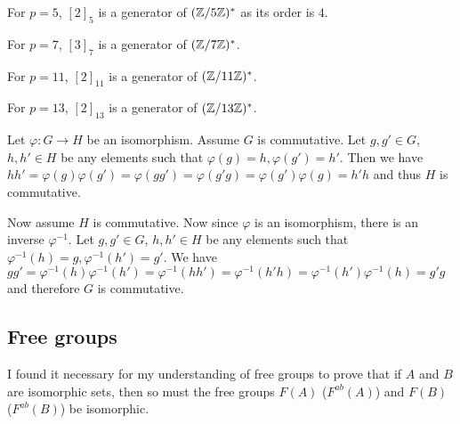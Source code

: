 \begin{problem}
\end{problem}

\begin{solution}
	For $p=5$, $[2]_5$ is a generator of $(\mathbb{Z}/5\mathbb{Z})^*$ as its order is $4$.
	
	For $p=7$, $[3]_7$ is a generator of $(\mathbb{Z}/7\mathbb{Z})^*$.
	
	For $p=11$, $[2]_{11}$ is a generator of $(\mathbb{Z}/11\mathbb{Z})^*$.
	
	For $p=13$, $[2]_{13}$ is a generator of $(\mathbb{Z}/13\mathbb{Z})^*$.
\end{solution}

\begin{problem}
\end{problem}

\begin{solution}
	Let $\varphi: G \to H$ be an isomorphism. Assume $G$ is commutative. Let $g, g' \in G$, $h, h' \in H$ be any elements such that $\varphi(g) = h, \varphi(g') = h'$. Then we have $h h' = \varphi(g) \varphi(g') = \varphi(gg') = \varphi(g'g) = \varphi(g') \varphi(g) = h' h$ and thus $H$ is commutative.
	
	Now assume $H$ is commutative. Now since $\varphi$ is an isomorphism, there is an inverse $\varphi^{-1}$. Let $g, g' \in G$, $h, h' \in H$ be any elements such that $\varphi^{-1}(h) = g, \varphi^{-1}(h') = g'$. We have $g g' = \varphi^{-1}(h) \varphi^{-1}(h') = \varphi^{-1}(h h') = \varphi^{-1}(h' h) = \varphi^{-1}(h') \varphi^{-1}(h) = g' g$ and therefore $G$ is commutative.
\end{solution}

\subsection{Free groups}

I found it necessary for my understanding of free groups to prove that if $A$ and $B$ are isomorphic sets, then so must the free groups $F(A)$ ($F^{ab}(A)$) and $F(B)$ ($F^{ab}(B)$) be isomorphic.

